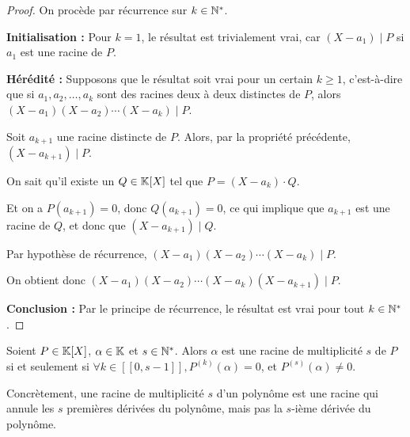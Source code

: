 \documentclass[12pt,a4paper]{report}
\begin{document}
\begin{proof}
    On procède par récurrence sur $k \in \mathbb{N}^*$.
    
    \textbf{Initialisation :} Pour $k = 1$, le résultat est trivialement vrai, car $(X-a_1) \mid P$ si $a_1$ est une racine de $P$.

    \textbf{Hérédité :} Supposons que le résultat soit vrai pour un certain $k \ge 1$, c'est-à-dire que si $a_1, a_2, \ldots, a_k$ sont des racines deux à deux distinctes de $P$, alors $(X-a_1)(X-a_2)\cdots(X-a_k) \mid P$.
    
    Soit $a_{k+1}$ une racine distincte de $P$. Alors, par la propriété précédente, $(X-a_{k+1}) \mid P$.

    On sait qu'il existe un $Q \in \mathbb{K}[X]$ tel que $P = (X-a_{k}) \cdot Q$.

    Et on a $P(a_{k+1}) = 0$, donc $Q(a_{k+1}) = 0$, ce qui implique que $a_{k+1}$ est une racine de $Q$, et donc que $(X-a_{k+1}) \mid Q$.
    
    Par hypothèse de récurrence, $(X-a_1)(X-a_2)\cdots(X-a_k) \mid P$. 

    On obtient donc $(X-a_1)(X-a_2)\cdots(X-a_k)(X-a_{k+1}) \mid P$.

    \textbf{Conclusion :} Par le principe de récurrence, le résultat est vrai pour tout $k \in \mathbb{N}^*$.
\end{proof}

\begin{property}
    Soient $P \in \mathbb{K}[X]$, $\alpha \in \mathbb{K}$ et $s\in \mathbb{N}^*$. Alors $\alpha$ est une racine de multiplicité $s$ de $P$ si et seulement si $\forall k \in [\![0,s-1]\!], P^{(k)}(\alpha) = 0$, et $P^{(s)}(\alpha) \ne 0$.

    Concrètement, une racine de multiplicité $s$ d'un polynôme est une racine qui annule les $s$ premières dérivées du polynôme, mais pas la $s$-ième dérivée du polynôme.
\end{property}
\end{document}
